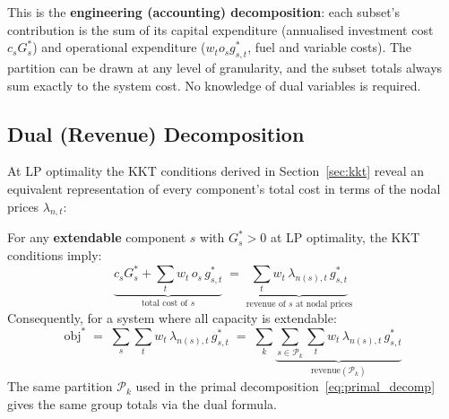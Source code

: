 \documentclass{article}
\begin{document}
This is the \textbf{engineering (accounting) decomposition}: each subset's
contribution is the sum of its capital expenditure (annualised investment cost
$c_s G_s^*$) and operational expenditure ($w_t o_s g_{s,t}^*$, fuel and
variable costs). The partition can be drawn at any level of granularity, and
the subset totals always sum exactly to the system cost. No knowledge of dual
variables is required.

\subsection{Dual (Revenue) Decomposition}
\label{sec:dual_decomp}

At LP optimality the KKT conditions derived in Section~\ref{sec:kkt} reveal
an equivalent representation of every component's total cost in terms of the
nodal prices $\lambda_{n,t}$:

\begin{tcolorbox}[colback=green!5, colframe=green!40!black,
  title={Theorem: Dual Objective Decomposition}]
For any \textbf{extendable} component $s$ with $G_s^* > 0$ at LP optimality,
the KKT conditions imply:
\begin{equation}
    \underbrace{c_s G_s^* + \sum_t w_t\, o_s\, g_{s,t}^*}_{\text{total cost of }s}
    \;=\;
    \underbrace{\sum_t w_t\, \lambda_{n(s),t}\, g_{s,t}^*}_{\text{revenue of }s\text{ at nodal prices}}
    \label{eq:dual_decomp_component}
\end{equation}
Consequently, for a system where all capacity is extendable:
\begin{equation}
    \text{obj}^*
    \;=\;
    \sum_s \sum_t w_t\, \lambda_{n(s),t}\, g_{s,t}^*
    \;=\;
    \sum_k \underbrace{\sum_{s \in \mathcal{P}_k}
      \sum_t w_t\, \lambda_{n(s),t}\, g_{s,t}^*}_{\displaystyle\text{revenue}(\mathcal{P}_k)}
    \label{eq:dual_decomp}
\end{equation}
The same partition $\mathcal{P}_k$ used in the primal decomposition~\eqref{eq:primal_decomp}
gives the same group totals via the dual formula.
\end{tcolorbox}
\end{document}
